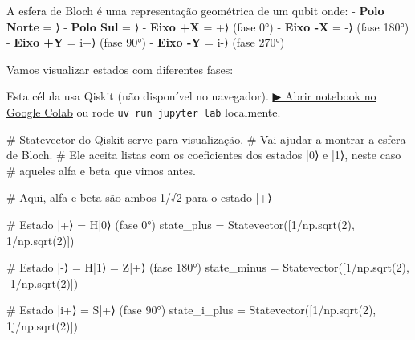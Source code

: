 \documentclass[
  brazilian,
]{report}
\newenvironment{Shaded}{\begin{snugshade}}{\end{snugshade}}
\newcommand{\CommentTok}[1]{\textcolor[rgb]{0.37,0.37,0.37}{#1}}
\newcommand{\DecValTok}[1]{\textcolor[rgb]{0.68,0.00,0.00}{#1}}
\newcommand{\NormalTok}[1]{\textcolor[rgb]{0.00,0.23,0.31}{#1}}
\newcommand{\OperatorTok}[1]{\textcolor[rgb]{0.37,0.37,0.37}{#1}}
\newcommand{\OtherTok}[1]{\textcolor[rgb]{0.00,0.23,0.31}{#1}}
\begin{document}
A esfera de Bloch é uma representação geométrica de um qubit onde: -
\textbf{Polo Norte} = ⟩ - \textbf{Polo Sul} = ⟩ -
\textbf{Eixo +X} = \textbar+⟩ (fase 0°) - \textbf{Eixo -X} = \textbar-⟩
(fase 180°) - \textbf{Eixo +Y} = \textbar i+⟩ (fase 90°) - \textbf{Eixo
-Y} = \textbar i-⟩ (fase 270°)

Vamos visualizar estados com diferentes fases:

\begin{tcolorbox}[enhanced jigsaw, arc=.35mm, bottomrule=.15mm, bottomtitle=1mm, breakable, colback=white, colbacktitle=quarto-callout-warning-color!10!white, colframe=quarto-callout-warning-color-frame, coltitle=black, left=2mm, leftrule=.75mm, opacityback=0, opacitybacktitle=0.6, rightrule=.15mm, title=\textcolor{quarto-callout-warning-color}{\faExclamationTriangle}\hspace{0.5em}{⚛️ Célula Qiskit --- execute no Colab ou localmente}, titlerule=0mm, toprule=.15mm, toptitle=1mm]

Esta célula usa Qiskit (não disponível no navegador).
\href{https://colab.research.google.com/github/maxwellamaral/aula-quantum/blob/main/notebooks/00b-phases.ipynb}{▶
Abrir notebook no Google Colab} ou rode \texttt{uv\ run\ jupyter\ lab}
localmente.

\begin{Shaded}
\begin{Highlighting}[]

\CommentTok{\# Statevector do Qiskit serve para visualização. }
\CommentTok{\# Vai ajudar a montrar a esfera de Bloch.}
\CommentTok{\# Ele aceita listas com os coeficientes dos estados |0⟩ e |1⟩, neste caso}
\CommentTok{\# aqueles alfa e beta que vimos antes.}

\CommentTok{\# Aqui, alfa e beta são ambos 1/√2 para o estado |+⟩}

\CommentTok{\# Estado |+⟩ = H|0⟩ (fase 0°)}
\NormalTok{state\_plus }\OperatorTok{=}\NormalTok{ Statevector([}\DecValTok{1}\OperatorTok{/}\NormalTok{np.sqrt(}\DecValTok{2}\NormalTok{), }\DecValTok{1}\OperatorTok{/}\NormalTok{np.sqrt(}\DecValTok{2}\NormalTok{)])}

\CommentTok{\# Estado |{-}⟩ = H|1⟩ = Z|+⟩ (fase 180°)}
\NormalTok{state\_minus }\OperatorTok{=}\NormalTok{ Statevector([}\DecValTok{1}\OperatorTok{/}\NormalTok{np.sqrt(}\DecValTok{2}\NormalTok{), }\OperatorTok{{-}}\DecValTok{1}\OperatorTok{/}\NormalTok{np.sqrt(}\DecValTok{2}\NormalTok{)])}

\CommentTok{\# Estado |i+⟩ = S|+⟩ (fase 90°)}
\NormalTok{state\_i\_plus }\OperatorTok{=}\NormalTok{ Statevector([}\DecValTok{1}\OperatorTok{/}\NormalTok{np.sqrt(}\DecValTok{2}\NormalTok{), }\OtherTok{1j}\OperatorTok{/}\NormalTok{np.sqrt(}\DecValTok{2}\NormalTok{)])}


\end{Highlighting}
\end{Shaded}
\end{tcolorbox}
\end{document}
